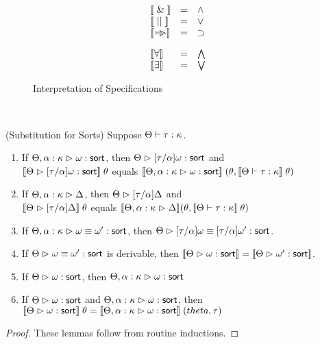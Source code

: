 \begin{figure}
\begin{displaymath}
\begin{array}{lcl}
\interp{\specand} & = & \land \\
\interp{\specor}  & = & \vee  \\
\interp{\specimp} & = & \implies \\[1em]

\interp{\forall} & = & \bigwedge \\
\interp{\exists} & = & \bigvee \\

\end{array}
\end{displaymath}
\caption{Interpretation of Specifications}
\label{spec-interpretation}  
\end{figure}

\ \\


\begin{lemma}{(Substitution for Sorts)}
Suppose $\judgeWK{\tau}{\kappa}$.
\begin{enumerate}
\item If $\judgeSort[\Theta, \alpha:\kappa]{\omega}$, then $\judgeSort[\Theta]{[\tau/\alpha]\omega}$ and \\
      $\interp{\judgeSort[\Theta]{[\tau/\alpha]\omega}}\;\theta$ equals
      $\interp{\judgeSort[\Theta, \alpha:\kappa]{\omega}}\;(\theta, \interp{\judgeWK{\tau}{\kappa}}\;\theta)$
\item If $\judgeACtx[\Theta, \alpha:\kappa]{\Delta}$, then $\judgeACtx{{[\tau/\alpha]}\Delta}$ and \\
      $\interp{\judgeACtx{{[\tau/\alpha]}\Delta}}\;\theta$ equals 
      $\interp{\judgeACtx[\Theta, \alpha:\kappa]{\Delta}}(\theta, \interp{\judgeWK{\tau}{\kappa}}\;\theta)$ 
\item If $\judgeSortEq[\Theta, \alpha:\kappa]{\omega}{\omega'}$, then
      $\judgeSortEq{{[\tau/\alpha]}\omega}{{[\tau/\alpha]}\omega'}$. 
\item If $\judgeSortEq{\omega}{\omega'}$ is derivable, then
      $\interp{\judgeSort{\omega}} = \interp{\judgeSort{\omega'}}$.
\item If $\judgeSort[\Theta]{\omega}$, then $\judgeSort[\Theta, \alpha:\kappa]{\omega}$
\item If $\judgeSort[\Theta]{\omega}$ and $\judgeSort[\Theta, \alpha:\kappa]{\omega}$, then
      $\interp{\judgeSort[\Theta]{\omega}}\;\theta = \interp{\judgeSort[\Theta, \alpha:\kappa]{\omega}}\;(theta,\tau)$
\end{enumerate}
\end{lemma}
\begin{proof}
  These lemmas follow from routine inductions.
\end{proof}

